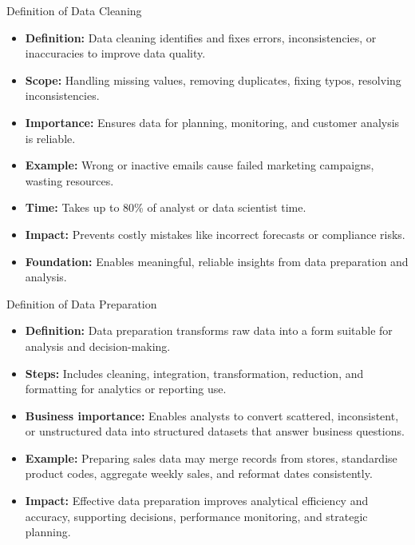 \documentclass[aspectratio=169, table]{beamer}
\begin{document}
\begin{frame}{Definition of Data Cleaning}
	\vspace{20pt}
	
	\begin{itemize}
		\item \textbf{Definition:} Data cleaning identifies and fixes errors, inconsistencies, or inaccuracies to improve data quality.
		
		\item \textbf{Scope:} Handling missing values, removing duplicates, fixing typos, resolving inconsistencies.
		
		\item \textbf{Importance:} Ensures data for planning, monitoring, and customer analysis is reliable.
		
		\item \textbf{Example:} Wrong or inactive emails cause failed marketing campaigns, wasting resources.
		
		\item \textbf{Time:} Takes up to 80\% of analyst or data scientist time.
		
		\item \textbf{Impact:} Prevents costly mistakes like incorrect forecasts or compliance risks.
		
		\item \textbf{Foundation:} Enables meaningful, reliable insights from data preparation and analysis.
	\end{itemize}
	
\end{frame}


\begin{frame}{Definition of Data Preparation}
	\vspace{20pt}
	
	\begin{itemize}
		\item \textbf{Definition:} Data preparation transforms raw data into a form suitable for analysis and decision-making.
		
		\item \textbf{Steps:} Includes cleaning, integration, transformation, reduction, and formatting for analytics or reporting use.
		
		\item \textbf{Business importance:} Enables analysts to convert scattered, inconsistent, or unstructured data into structured datasets that answer business questions.
		
		\item \textbf{Example:} Preparing sales data may merge records from stores, standardise product codes, aggregate weekly sales, and reformat dates consistently.
		
		\item \textbf{Impact:} Effective data preparation improves analytical efficiency and accuracy, supporting decisions, performance monitoring, and strategic planning.
	\end{itemize}
	
\end{frame}
\end{document}
